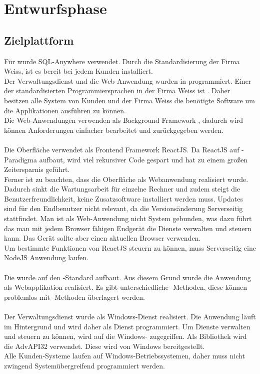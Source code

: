 \section{Entwurfsphase} 
\label{sec:Entwurfsphase}

\subsection{Zielplattform}
\label{sec:Zielplattform}

Für  wurde SQL-Anywhere verwendet. Durch die Standardisierung der Firma Weiss, ist es bereit bei jedem Kunden installiert. \\
Der Verwaltungsdienst und die Web-Anwendung wurden in  programmiert. Einer der standardisierten Programmiersprachen in der Firma Weiss ist . Daher besitzen alle System von Kunden und der Firma Weiss die benötigte Software um die Applikationen ausführen zu können. \\
Die Web-Anwendungen verwenden als Background Framework , dadurch wird können  Anforderungen einfacher bearbeitet und zurückgegeben werden. \\
\\
Die Oberfläche verwendet als Frontend Framework ReactJS. Da ReactJS auf -Paradigma aufbaut, wird viel rekursiver Code gespart und hat zu einem großen Zeitersparnis geführt.  \\
Ferner ist zu beachten, dass die Oberfläche als Webanwendung realisiert wurde. Dadurch sinkt die Wartungsarbeit für einzelne Rechner und zudem steigt die Benutzerfreundlichkeit, keine Zusatzsoftware installiert werden muss. Updates sind für den Endbenutzer nicht relevant, da die Versionsänderung Serverseitig stattfindet. Man ist als Web-Anwendung nicht System gebunden, was dazu führt das man mit jedem Browser fähigen Endgerät die Dienste verwalten und steuern kann. Das Gerät sollte aber einen aktuellen Browser verwenden. \\
Um bestimmte Funktionen von ReactJS steuern zu können, muss Serverseitig eine NodeJS Anwendung laufen. \\
\\
Die  wurde auf den -Standard aufbaut. Aus diesem Grund wurde die Anwendung als Webapplikation realisiert. Es gibt unterschiedliche -Methoden, diese können problemlos mit -Methoden überlagert werden.\\
\\
Der Verwaltungsdienst wurde als Windows-Dienst realisiert. Die Anwendung läuft im Hintergrund und wird daher als Dienst programmiert. Um Dienste verwalten und steuern zu können, wird auf die Windows- zugegriffen. Als Bibliothek wird die AdvAPI32 verwendet. Diese wird von Windows bereitgestellt. \\
Alle Kunden-Systeme laufen auf Windows-Betriebssystemen, daher muss nicht zwingend Systemübergreifend programmiert werden.

